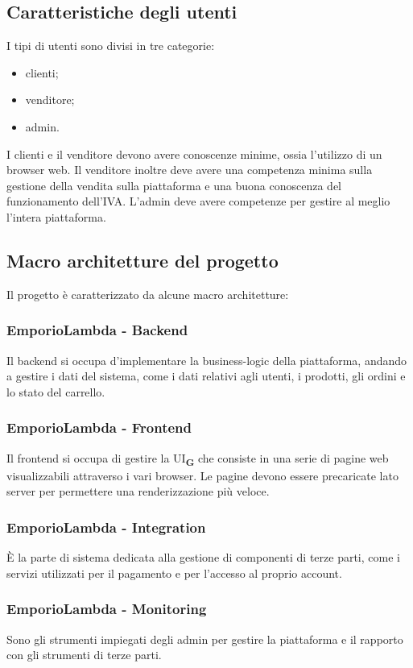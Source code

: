 \subsection{Caratteristiche degli utenti}
I tipi di utenti sono divisi in tre categorie:
\begin{itemize}
    \item clienti;
    \item venditore;
    \item admin.
\end{itemize}
I clienti e il venditore devono avere conoscenze minime, ossia l'utilizzo di un browser web. Il venditore inoltre deve avere una competenza minima sulla gestione della vendita sulla piattaforma e una buona conoscenza del funzionamento dell'IVA. L'admin deve avere competenze per gestire al meglio l'intera piattaforma.
\subsection{Macro architetture del progetto}
Il progetto è caratterizzato da alcune macro architetture:
\subsubsection{EmporioLambda - Backend}
Il backend si occupa d'implementare la business-logic della piattaforma, andando a gestire i dati del sistema, come i dati relativi agli utenti, i prodotti, gli ordini e lo stato del carrello. 
\subsubsection{EmporioLambda - Frontend}
Il frontend si occupa di gestire la UI\textsubscript{\textbf{G}} che consiste in una serie di pagine web visualizzabili attraverso i vari browser. Le pagine devono essere precaricate lato server per permettere una renderizzazione più veloce.
\subsubsection{EmporioLambda - Integration}
È la parte di sistema dedicata alla gestione di componenti di terze parti, come i servizi utilizzati per il pagamento e per l'accesso al proprio account.
\subsubsection{EmporioLambda - Monitoring}
Sono gli strumenti impiegati degli admin per gestire la piattaforma e il rapporto con gli strumenti di terze parti.






